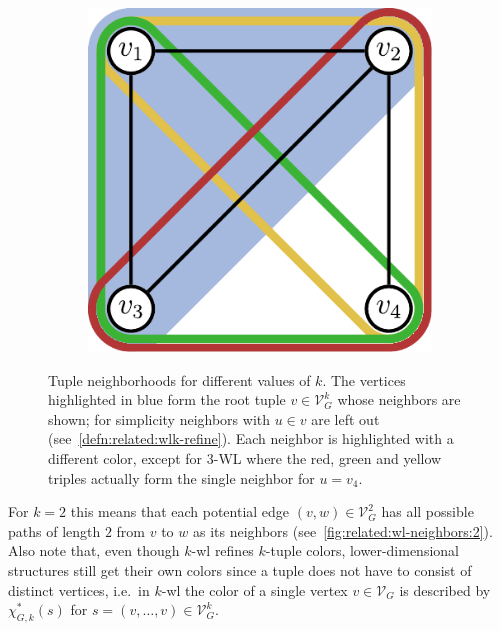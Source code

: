 \begin{figure}[ht]
	\begin{subfigure}{0.33\textwidth}
		\centering
		\includegraphics[width=0.8\linewidth]{gfx/related-work/wl3-neighbors.pdf}
		\label{fig:related:wl-neighbors:3}
	\end{subfigure}
	\caption[\ac{wl} neighborhoods for different values of $k$.]{
		Tuple neighborhoods for different values of $k$.
		The vertices highlighted in \textcolor{t_blue}{blue} form the root tuple $v \in \mathcal{V}_G^k$ whose neighbors are shown;
		for simplicity neighbors with $u \in v$ are left out (see~\cref{defn:related:wlk-refine}).
		Each neighbor is highlighted with a different color, except for 3-WL where the \textcolor{t_red}{red}, \textcolor{t_green}{green} and \textcolor{t_darkyellow}{yellow} triples actually form the single neighbor for $u = v_4$.
	}\label{fig:related:wl-neighbors}
\end{figure}
For $k = 2$ this means that each potential edge $(v, w) \in \mathcal{V}_G^2$ has all possible paths of length $2$ from $v$ to $w$ as its neighbors (see~\cref{fig:related:wl-neighbors:2}).
Also note that, even though $k$-\acs{wl} refines $k$-tuple colors, lower-dimensional structures still get their own colors since a tuple does not have to consist of distinct vertices, i.e.\ in $k$-\acs{wl} the color of a single vertex $v \in \mathcal{V}_G$ is described by $\chi^{*}_{G, k}(s)$ for $s = (v, \dots, v) \in \mathcal{V}_G^k$.

